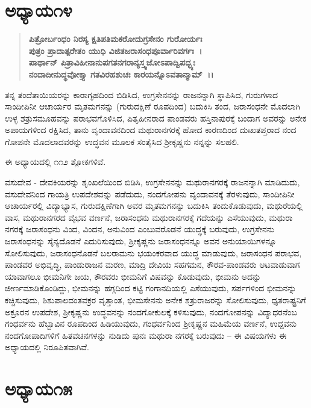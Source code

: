 \section*{ಅಧ್ಯಾಯ\enginline{-}೧೪}

\begin{verse}
\textbf{ಪಿತ್ರೋರ್ಬಂಧಂ ನಿರಸ್ಯ ಕ್ಷತಿಪತಿಮಕರೋದುಗ್ರಸೇನಂ ಗುರೋರ್ಯಃ}\\\textbf{ಪುತ್ರಂ ಪ್ರಾದಾತ್ಪರೇತಂ ಯುಧಿ ವಿಜಿತಜರಾಸಂಧಪೂರ್ವಾರಿವರ್ಗಃ~।}\\\textbf{ಪಾರ್ಥಾನ್ ಪಿತ್ರಾವಿಹೀನಾನುಪಗತನಗರಾನ್ಯಸ್ತ್ವಜೋಽಪಾದ್ವಿಪದ್ಭ್ಯಃ}\\\textbf{ನಂದಾದೀನುದ್ಧವೋಕ್ತ್ಯಾ ಗತವಿರಹಶುಚಃ ಕಾರಯನ್ನೊಽವತಾನ್ಮಾಮ್~।।}
\end{verse}

ತನ್ನ ತಂದೆತಾಯಿಯರನ್ನು ಕಾರಾಗೃಹದಿಂದ ಬಿಡಿಸಿದ, ಉಗ್ರಸೇನನನ್ನು ರಾಜನನ್ನಾಗಿ ಸ್ಥಾಪಿಸಿದ, ಗುರುಗಳಾದ ಸಾಂದೀಪಿನೀ ಆಚಾರ್ಯರ ಮೃತಮಗನನ್ನು (ಗುರುದಕ್ಷಿಣೆ ರೂಪದಿಂದ) ಬದುಕಿಸಿ ತಂದ, ಜರಾಸಂಧನೇ ಮೊದಲಾಗಿ ಉಳ್ಳ ಶತ್ರುಸಮೂಹವನ್ನು ಪರಾಭವಗೊಳಿಸಿದ, ಪಿತೃಹೀನರಾದ ಪಾಂಡವರು ಹಸ್ತಿನಾಪುರಕ್ಕೆ ಬಂದಾಗ ಅವರನ್ನು ಅನೇಕ ಅಪಾಯಗಳಿಂದ ರಕ್ಷಿಸಿದ, ತಾನು ವೃಂದಾವನದಿಂದ ಮಥುರಾನಗರಕ್ಕೆ ಹೋದ ಕಾರಣದಿಂದ ದುಃಖತಪ್ತರಾದ ನಂದ ಗೋಪನೇ ಮೊದಲಾದವರನ್ನು ಉದ್ಧವನ ಮೂಲಕ ಸಂತೈಸಿದ ಶ‍್ರೀಕೃಷ್ಣನು ನನ್ನನ್ನು ಸಲಹಲಿ.

ಈ ಅಧ್ಯಾಯದಲ್ಲಿ ೧೧೨ ಶ್ಲೋಕಗಳಿವೆ.

ವಸುದೇವ - ದೇವಕಿಯರನ್ನು ಶೃಂಖಲೆಯಿಂದ ಬಿಡಿಸಿ, ಉಗ್ರಸೇನನನ್ನು ಮಥುರಾನಗರಕ್ಕೆ ರಾಜನನ್ನಾಗಿ ಮಾಡಿದುದು, ವಸುದೇವನಿಂದ ಗಾಯತ್ರಿ ಉಪದೇಶವನ್ನು ಪಡೆದುದು, ನಂದಗೋಪನು ವೃಂದಾವನಕ್ಕೆ ತೆರಳುವುದು, ಸಾಂದೀಪಿನೀ ಆಚಾರ್ಯರಲ್ಲಿ ವಿದ್ಯಾಭ್ಯಾಸ, ಗುರುದಕ್ಷಿಣೆಗಾಗಿ ಅವರ ಮೃತಮಗನನ್ನು ಬದುಕಿಸಿ ತಂದುಕೊಡುವುದು, ಮಥುರೆಯಲ್ಲಿ ವಾಸ, ಮಥುರಾನಗರದ ವೈಭವ ವರ್ಣನೆ, ಜರಾಸಂಧನು ಮಥುರಾನಗರಕ್ಕೆ ಗದೆಯನ್ನು ಎಸೆಯುವುದು, ಮಥುರಾ ನಗರಕ್ಕೆ ಜರಾಸಂಧನು ವಿಂದ, ವಿಂದನ, ಅನುವಿಂದ ಎಂಬುವರೊಡನೆ ಯುದ್ಧಕ್ಕೆ ಬರುವುದು, ಉಗ್ರಸೇನನು ಜರಾಸಂಧನನ್ನು ಸೈನ್ಯದೊಡನೆ ಎದುರಿಸುವುದು, ಶ‍್ರೀಕೃಷ್ಣನು ಜರಾಸಂಧನನ್ನೂ ಅವನ ಅನುಯಾಯಿಗಳನ್ನೂ ಸೋಲಿಸುವುದು, ಜರಾಸಂಧನೊಡನೆ ಬಲರಾಮನು ಭಯಂಕರವಾದ ಯುದ್ಧ ಮಾಡುವುದು, ಜರಾಸಂಧನ ಪರಾಭವ, ಪಾಂಡವರ ಅಭಿವೃದ್ಧಿ, ಪಾಂಡುರಾಜನ ಮರಣ, ಮಾದ್ರಿ ದೇವಿಯ ಸಹಗಮನ, ಕೌರವ-ಪಾಂಡವರು ಆಟವಾಡುವಾಗ ಯಾವಾಗಲೂ ಭೀಮನಿಗೇ ಜಯ, ಕೌರವರು ಭೀಮನಿಗೆ ವಿಷವನ್ನು ಕೊಡುವುದು, ಭೀಮನು ಅದನ್ನು ಜೀರ್ಣಮಾಡಿಕೊಂಡಿದ್ದು, ಭೀಮನನ್ನು ಹಗ್ಗದಿಂದ ಕಟ್ಟಿ ಗಂಗಾನದಿಯಲ್ಲಿ ಎಸೆಯುವುದು, ಸರ್ಪಗಳಿಂದ ಭೀಮನನ್ನು ಕಚ್ಚಿಸುವುದು, ಶಿಶುಪಾಲದಂತವಕ್ರರ ವೃತ್ತಾಂತ, ಭೀಮಸೇನನು ಅನೇಕ ಶತ್ರುರಾಜರನ್ನು ಸೋಲಿಸುವುದು, ಧೃತರಾಷ್ಟ್ರನಿಗೆ ಅಕ್ರೂರನ ಉಪದೇಶ, ಶ‍್ರೀಕೃಷ್ಣನು ಉದ್ಧವನನ್ನು ನಂದಗೋಕುಲಕ್ಕೆ ಕಳಿಸುವುದು, ನಂದಗೋಪನನ್ನು ವಿದ್ಯಾಧರನೆಂಬ ಗಂಧರ್ವನು ಹೆಬ್ಬಾವಿನ ರೂಪದಿಂದ ಹಿಡಿಯುವುದು, ಗಂಧರ್ವನಿಂದ ಶ‍್ರೀಕೃಷ್ಣನ ಮಹಿಮೆಯ ವರ್ಣನೆ, ಉದ್ದವನು ನಂದಗೋಪಾದಿಗಳಿಗೆ ಹಿತವಚನಗಳನ್ನು ನುಡಿದು ಪುನಃ ಮಥುರಾ ನಗರಕ್ಕೆ ಬರುವುದು – ಈ ವಿಷಯಗಳು ಈ ಅಧ್ಯಾಯದಲ್ಲಿ ನಿರೂಪಿತವಾಗಿವೆ.


\section*{ಅಧ್ಯಾಯ\enginline{-}೧೫}

